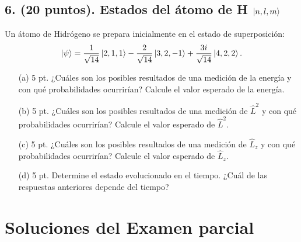 \documentclass[a4paper,11pt]{article}
\begin{document}
\subsection*{6. (20 puntos). Estados del átomo de H $\ket{n,l,m}$}
Un átomo de Hidrógeno se prepara inicialmente en el estado de superposición:
\[
\ket{\psi}=\frac{1}{\sqrt{14}}\ket{2,1,1}-\frac{2}{\sqrt{14}}\ket{3,2,-1}+\frac{3i}{\sqrt{14}}\ket{4,2,2}.
\]
\begin{enumerate}
  \item[(a)] 5 pt. ¿Cuáles son los posibles resultados de una medición de la energía y con qué probabilidades ocurrirían? Calcule el valor esperado de la energía.
  \item[(b)] 5 pt. ¿Cuáles son los posibles resultados de una medición de $\hat L^2$ y con qué probabilidades ocurrirían? Calcule el valor esperado de $\hat L^2$.
  \item[(c)] 5 pt. ¿Cuáles son los posibles resultados de una medición de $\hat L_z$ y con qué probabilidades ocurrirían? Calcule el valor esperado de $\hat L_z$.
  \item[(d)] 5 pt. Determine el estado evolucionado en el tiempo. ¿Cuál de las respuestas anteriores depende del tiempo?
\end{enumerate}

\section*{Soluciones del Examen parcial}
\end{document}
